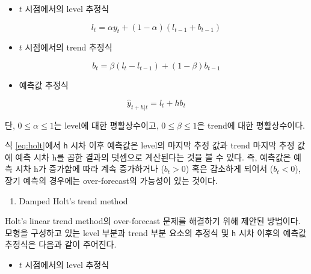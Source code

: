 \documentclass[
]{book}
\providecommand{\tightlist}{%
  \setlength{\itemsep}{0pt}\setlength{\parskip}{0pt}}
\begin{document}
\begin{itemize}
\tightlist
\item
  \(t\) 시점에서의 level 추정식
\end{itemize}

\begin{equation}
l_{t} = \alpha y_{t} + (1-\alpha) (l_{t-1} + b_{t-1}) 
\end{equation}

\begin{itemize}
\tightlist
\item
  \(t\) 시점에서의 trend 추정식
\end{itemize}

\begin{equation}
b_{t} = \beta (l_{t} - l_{t-1}) + (1-\beta) b_{t-1}
\end{equation}

\begin{itemize}
\tightlist
\item
  예측값 추정식
\end{itemize}

\begin{equation}
\hat{y}_{t+h|t} = l_{t} + h b_{t} \label{eq:holt}
\end{equation}

단, \(0 \leq \alpha \leq 1\)는 level에 대한 평활상수이고, \(0 \leq \beta \leq 1\)은 trend에 대한 평활상수이다.

식 \eqref{eq:holt}에서 \texttt{h} 시차 이후 예측값은 level의 마지막 추정 값과 trend 마지막 추정 값에 예측 시차 h를 곱한 결과의 덧셈으로 계산된다는 것을 볼 수 있다. 즉, 예측값은 예측 시차 h가 증가함에 따라 계속 증가하거나 (\(b_{t} > 0\)) 혹은 감소하게 되어서 (\(b_{t} < 0\)), 장기 예측의 경우에는 over-forecast의 가능성이 있는 것이다.

\begin{enumerate}
\def\labelenumi{\arabic{enumi}.}
\setcounter{enumi}{1}
\tightlist
\item
  Damped Holt's trend method
\end{enumerate}

Holt's linear trend method의 over-forecast 문제를 해결하기 위해 제안된 방법이다. 모형을 구성하고 있는 level 부분과 trend 부분 요소의 추정식 및 \texttt{h} 시차 이후의 예측값 추정식은 다음과 같이 주어진다.

\begin{itemize}
\tightlist
\item
  \(t\) 시점에서의 level 추정식
\end{itemize}
\end{document}
